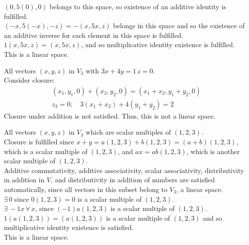 \documentclass[twoside]{amsart}
\theoremstyle{plain}
\theoremstyle{definition}
\newcommand{\exercisehead}[1]
  {
   \noindent{\small\bf Exercise #1.}
   \smallskip}
\begin{document}
$(0,5(0),0)$ belongs to this space, so existence of an additive identity is fulfilled. \\

$(-x,5(-x),-z) = -(x,5x,z)$ belongs in this space and so the existence of an additive inverse for each element in this space is fulfilled.  \\

$1(x,5x,z) = (x,5x,z)$, and so multiplicative identity existence is fulfilled.  \\
This is a linear space.  

\exercisehead{25} All vectors $(x,y,z)$ in $V_3$ with $3x + 4y = 1 \, z=0$.  \smallskip \\
Consider closure: 
\[
\begin{gathered}
(x_1,y_1,0) + (x_2,y_2,0) = (x_1+x_2, y_1+y_2,0) \\
  z_3 = 0; \quad 3(x_1+x_2) + 4(y_1+y_2) = 2
\end{gathered}
\]
Closure under addition is not satisfied.  Thus, this is not a linear space.  

\exercisehead{26} All vectors $(x,y,z)$ in $V_3$ which are scalar multiples of $(1,2,3)$.    \smallskip \\
Closure is fulfilled since $x+y= a(1,2,3) +b(1,2,3) = (a+b)(1,2,3)$, which is a scalar multiple of $(1,2,3)$, and $ax = ab(1,2,3)$, which is another scalar multiple of $(1,2,3)$.  \\

Additive commutativity, additive associativity, scalar associativity, distributivity in addition in $V$, and distributivity in addition of numbers are satisfied automatically, since all vectors in this subset belong to $V_3$, a linear space.  \\

$\exists \, 0$ since $0(1,2,3) = 0$ is a scalar multiple of $(1,2,3)$.  \\

$\exists \, -1x \, \forall \, x$, since $(-1)a(1,2,3)$ is a scalar multiple of $(1,2,3)$.  \\

$1(a(1,2,3)) = (a(1,2,3))$ is a scalar multiple of $(1,2,3)$ and so multiplicative identity existence is satisfied.   \\
This is a linear space.  
\end{document}

